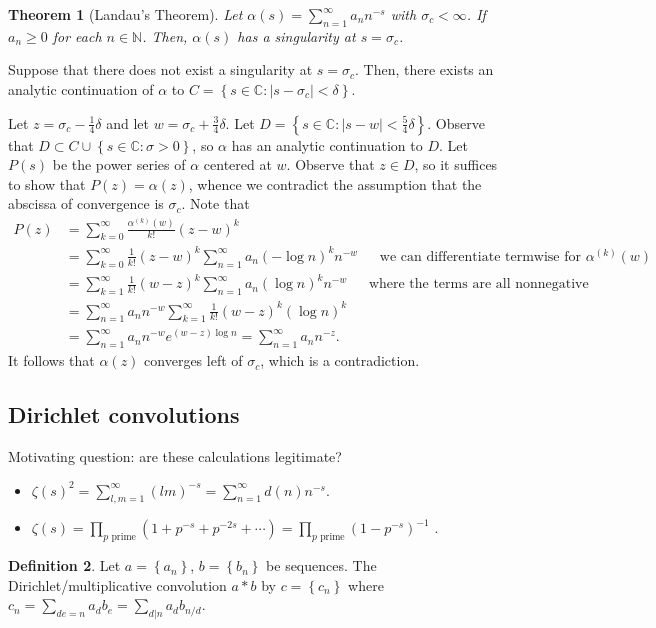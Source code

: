 \documentclass[11pt]{article}
\newtheorem{thm}{Theorem}[subsection]
\theoremstyle{definition}
\newtheorem{defn}[thm]{Definition}
\newcommand{\set}[1]{\left\{ #1 \right\}}
\newcommand{\s}[0]{\sigma}
\newcommand{\abs}[1]{\left\lvert#1\right\rvert} %
\newcommand{\NN}{\mathbb{N}}
\newcommand{\CC}{\mathbb{C}}
\begin{document}
\begin{thm}[Landau's Theorem]
Let $\alpha(s)=\sum_{n=1}^\infty a_nn^{-s}$ with $\s_c<\infty$. If $a_n\ge0$ for each
$n\in\NN$. Then, $\alpha(s)$ has a singularity at $s=\s_c$.
\end{thm}
\proof
Suppose that there does not exist a singularity at $s=\s_c$. Then, there exists an analytic
continuation of $\alpha$ to $C=\set{s\in\CC:\abs{s-\s_c}<\delta}$.

Let $z=\s_c-\frac14\delta$ and let $w=\s_c+\frac34\delta$. Let
$D=\set{s\in\CC:\abs{s-w}<\frac54\delta}$. Observe that $D\subset C\cup\set{s\in\CC:\s>0}$,
so $\alpha$ has an analytic continuation to $D$. Let $P(s)$ be the power series of $\alpha$
centered at $w$. Observe that $z\in D$, so it suffices to show that $P(z)=\alpha(z)$,
whence we contradict the assumption that the abscissa of convergence is $\s_c$. Note that
\begin{align*}
P(z) &= \sum_{k=0}^\infty \frac{\alpha^{(k)}(w)}{k!} (z-w)^k \\
&= \sum_{k=0}^\infty \frac{1}{k!}(z-w)^k \sum_{n=1}^\infty a_n(-\log n)^k n^{-w}
~~~~~~~\text{we can differentiate termwise for }\alpha^{(k)}(w) \\
&= \sum_{k=1}^\infty \frac{1}{k!}(w-z)^k \sum_{n=1}^\infty a_n(\log n)^k n^{-w}
~~~~~~~\text{where the terms are all nonnegative} \\
&= \sum_{n=1}^\infty a_nn^{-w} \sum_{k=1}^\infty \frac{1}{k!}(w-z)^k(\log n)^k \\
&= \sum_{n=1}^\infty a_nn^{-w} e^{(w-z)\log n} = \sum_{n=1}^\infty a_nn^{-z} .
\end{align*}
It follows that $\alpha(z)$ converges left of $\s_c$, which is a contradiction.
\qedhere


\subsection{Dirichlet convolutions}

Motivating question: are these calculations legitimate?
\begin{itemize}
\item $\zeta(s)^2 = \sum_{l,m=1}^\infty (lm)^{-s} = \sum_{n=1}^\infty d(n)n^{-s}$.
\item $\zeta(s) = \prod_{p\text{ prime}}(1+p^{-s}+p^{-2s}+\cdots) = \prod_{p\text{ prime}}
(1-p^{-s})^{-1}$ .
\end{itemize}

\begin{defn}
  Let $a=\set{a_n}$, $b=\set{b_n}$ be sequences. The Dirichlet/multiplicative convolution
  $a*b$ by $c=\set{c_n}$ where $c_n = \sum_{de=n}a_db_e = \sum_{d|n}a_db_{n/d}$.
\end{defn}
\end{document}
